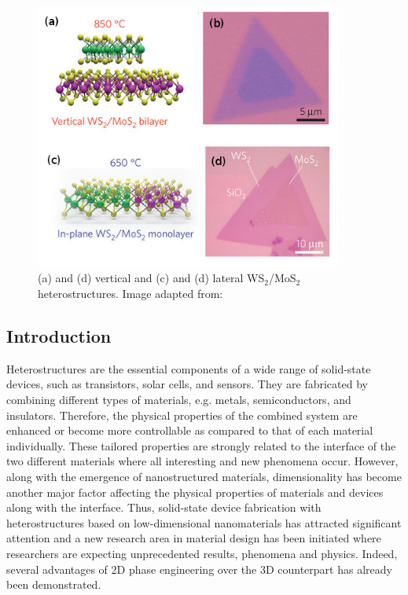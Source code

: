 \begin{figure}[htbp]
\centering
\includegraphics[width=0.9\textwidth]{ver-lat-stru.png}
\caption{ (a) and (d) vertical and (c) and (d) lateral WS$_2$/MoS$_2$ heterostructures. \label{fig:ver-lat-stru} Image adapted from: \cite{Gong_Lin2014}}
\end{figure}

\subsection{Introduction}
Heterostructures are the essential components of a wide range of solid-state devices, such as transistors, solar cells, and sensors\cite{singh1993,agostini2011}. They are  fabricated by combining different types of materials, e.g. metals, semiconductors, and insulators. Therefore, the physical properties of the combined system are enhanced or become more controllable as compared to that of each material individually. These tailored properties are strongly related to the interface of the two different materials where all interesting and new phenomena occur. However, along with the emergence of nanostructured materials, dimensionality has become another major factor affecting the physical properties of materials and devices along with the interface. Thus, solid-state device fabrication with heterostructures based on low-dimensional nanomaterials has attracted significant attention and a new research area in material design has been initiated where researchers are expecting unprecedented results, phenomena and physics\cite{Gan2013,Wu2015c,DiBartolomeo2016}. Indeed, several advantages of 2D phase engineering over the 3D counterpart has already been demonstrated.\cite{Duerloo2015}

